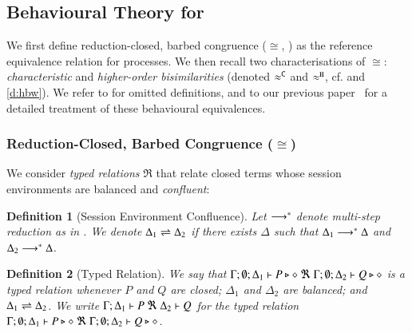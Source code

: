 \documentclass[preprint,11pt]{elsarticle}
\newtheorem{definition}{Definition}[section]
\begin{document}
{%

\subsection{Behavioural Theory for \HOp}\label{sec:bt}
%

We first define reduction-closed, barbed congruence ($\cong$, ) as the
reference equivalence relation for \HOp processes.
We then recall two characterisations of $\cong$:
\emph{characteristic} and
\emph{higher-order bisimilarities}   
 (denoted $\approx^\mathtt{C}$ and $\approx^\mathtt{H}$, cf.  and \ref{d:hbw}). 
 We refer to  for omitted definitions, 
 and to our previous paper~\cite{KouzapasPY17} for a detailed treatment of these behavioural equivalences. 

\subsubsection{Reduction-Closed, Barbed Congruence ($\cong$)}
\label{subsec:rc}

We consider \emph{typed relations} $\Re$ that relate  closed terms whose
session environments %
are balanced  and \emph{confluent}:

\begin{definition}[Session Environment Confluence]
Let $\longrightarrow^\ast$ denote multi-step reduction as in .
	We denote $\Delta_1 \rightleftharpoons \Delta_2$ if there exists $\Delta$ such that
	$\Delta_1 \longrightarrow^\ast \Delta$ and $\Delta_2 \longrightarrow^\ast \Delta$.
\end{definition}



\begin{definition}[Typed Relation]
	We say that
	$\Gamma; \emptyset; \Delta_1 \vdash P \triangleright \diamond\ \Re \ \Gamma; \emptyset; \Delta_2 \vdash Q \triangleright \diamond$
	is a {\em typed relation} whenever
	$P$ and $Q$ are closed;
	$\Delta_1$ and $\Delta_2$ are balanced; and 
	$\Delta_1 \rightleftharpoons \Delta_2$.
	We write $\horel{\Gamma}{\Delta_1}{P}{\ \Re \ }{\Delta_2}{Q}$
	for the typed relation $\Gamma; \emptyset; \Delta_1 \vdash P \triangleright \diamond\ \Re \ \Gamma; \emptyset; \Delta_2 \vdash Q \triangleright \diamond$.
\end{definition}

}
\end{document}
